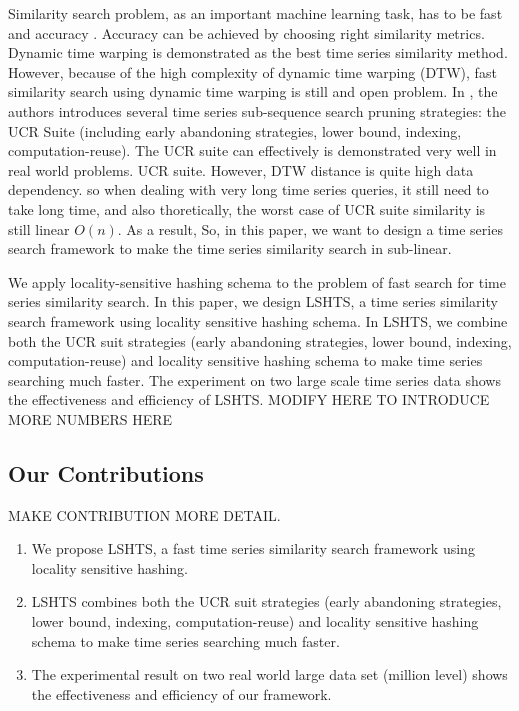 \documentclass{article}
\begin{document}
Similarity search problem, as an important machine learning task, has to be fast and accuracy \cite{kale2014examination}. Accuracy can be achieved by choosing right similarity metrics. Dynamic time warping \cite{rakthanmanon2012searching} is demonstrated as the best time series similarity method. However, because of the high complexity of dynamic time warping (DTW), fast similarity search using dynamic time warping is still and open problem. In \cite{rakthanmanon2012searching}, the authors introduces several time series sub-sequence search pruning strategies: the UCR Suite (including early abandoning strategies, lower bound, indexing, computation-reuse). The UCR suite can effectively is demonstrated very well in real world problems. UCR suite.
However, DTW distance is quite high data dependency. so when dealing with very long time series queries, it still need to take long time, and also thoretically, the worst case of UCR suite similarity is still linear $O(n)$. As a result, 
So, in this paper, we want to design a time series search framework to make the time series similarity search in sub-linear.

We apply locality-sensitive hashing schema \cite{gionis1999similarity} to the problem of fast search for time series similarity search. In this paper, we design LSHTS, a time series similarity search framework using locality sensitive hashing schema. 
In LSHTS, we combine both the UCR suit strategies (early abandoning strategies, lower bound, indexing, computation-reuse) and locality sensitive hashing schema to make time series searching much faster. The experiment on two large scale time series data shows the effectiveness and efficiency of LSHTS.
{\color{Red} MODIFY HERE TO INTRODUCE MORE NUMBERS HERE}

\subsection{Our Contributions}
{\color{Red} MAKE CONTRIBUTION MORE DETAIL.}

\begin{enumerate}
  \item We propose LSHTS, a fast time series similarity search framework using locality sensitive hashing.
  
  \item LSHTS combines both the UCR suit strategies (early abandoning strategies, lower bound, indexing, computation-reuse) and locality sensitive hashing schema to make time series searching much faster.
  
  \item The experimental result on two real world large data set (million level) shows the effectiveness and efficiency of our framework.
\end{enumerate}
\end{document}
